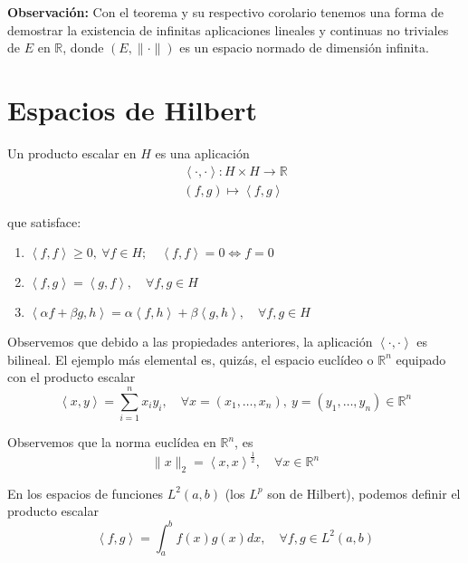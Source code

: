 \documentclass{article}
\begin{document}
\textbf{Observación:} Con el teorema y su respectivo corolario tenemos una forma de demostrar la existencia de infinitas aplicaciones lineales y continuas no triviales de $E$ en $\mathbb{R}$, donde $(E,\|\cdot\|)$ es un espacio normado de dimensión infinita.

\section{Espacios de Hilbert}
Un producto escalar en $H$ es una aplicación 
\begin{gather*}
\left\langle\cdot,\cdot\right\rangle:H\times H\rightarrow \mathbb{R}\\
(f,g)\mapsto \left\langle f,g\right\rangle
\end{gather*}

que satisface:
\begin{enumerate}
\item $\left\langle f,f\right\rangle\geq 0,\:\forall f\in H;\quad \left\langle f,f\right\rangle=0\Leftrightarrow f=0$

\item $\left\langle f,g\right\rangle =\left\langle g,f\right\rangle,\quad \forall f,g\in H$

\item $\left\langle \alpha f+\beta g,h\right\rangle =\alpha \left\langle f,h\right\rangle +\beta \left\langle g,h\right\rangle,\quad \forall f,g\in H$
\end{enumerate}

Observemos que debido a las propiedades anteriores, la aplicación $\left\langle\cdot,\cdot\right\rangle$ es bilineal. El ejemplo más elemental es, quizás, el espacio euclídeo o $\mathbb{R}^n$ equipado con el producto escalar
\begin{equation*}
\left\langle x,y\right\rangle =\sum_{i=1}^n x_iy_i,\quad \forall x=(x_1,\ldots,x_n),\:y=(y_1,\ldots,y_n)\in \mathbb{R}^n
\end{equation*}

Observemos que la norma euclídea en $\mathbb{R}^n$, es 
\begin{equation*}
\|x\|_2=\left\langle x,x\right\rangle^{\frac{1}{2}},\quad \forall x\in\mathbb{R}^n
\end{equation*}

En los espacios de funciones $L^2(a,b)$ (los $L^p$ son de Hilbert), podemos definir el producto escalar
\begin{equation*}
\left\langle f,g\right\rangle = \int_a^b f(x)g(x) dx, \quad \forall f,g\in L^2(a,b)
\end{equation*}
\end{document}

